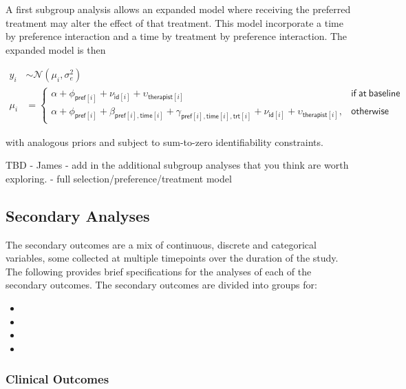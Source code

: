 \documentclass[
]{article}
\begin{document}
A first subgroup analysis allows an expanded model where receiving the preferred treatment may alter the effect of that treatment.
This model incorporate a time by preference interaction and a time by treatment by preference interaction.
The expanded model is then

\[
\begin{aligned}
y_{i} &\sim \mathcal{N}(\mu_{i}, \sigma_e^2) \\
\mu_i &= \begin{cases}
      \alpha + \phi_{\mathsf{pref}[i]} + \nu_{\mathsf{id}[i]} + \upsilon_{\mathsf{therapist}[i]} & \mathsf{if \ at \ baseline} \\
      \alpha + \phi_{\mathsf{pref}[i]} + \beta_{\mathsf{pref}[i], \mathsf{time}[i]} + \gamma_{\mathsf{pref}[i], \mathsf{time}[i],\mathsf{trt}[i]} + \nu_{\mathsf{id}[i]} + \upsilon_{\mathsf{therapist}[i]},  & \mathsf{otherwise}
    \end{cases}
\end{aligned}
\]

with analogous priors and subject to sum-to-zero identifiability constraints.

TBD - James - add in the additional subgroup analyses that you think are worth exploring.
- full selection/preference/treatment model

\hypertarget{secondary-analyses}{%
\subsection{Secondary Analyses}\label{secondary-analyses}}

The secondary outcomes are a mix of continuous, discrete and categorical variables, some collected at multiple timepoints over the duration of the study.
The following provides brief specifications for the analyses of each of the secondary outcomes.
The secondary outcomes are divided into groups for:

\begin{itemize}
\item {}
\item {}
\item {}
\item {}
\end{itemize}

\hypertarget{clinical-outcomes}{%
\subsubsection{Clinical Outcomes}\label{clinical-outcomes}}
\end{document}
